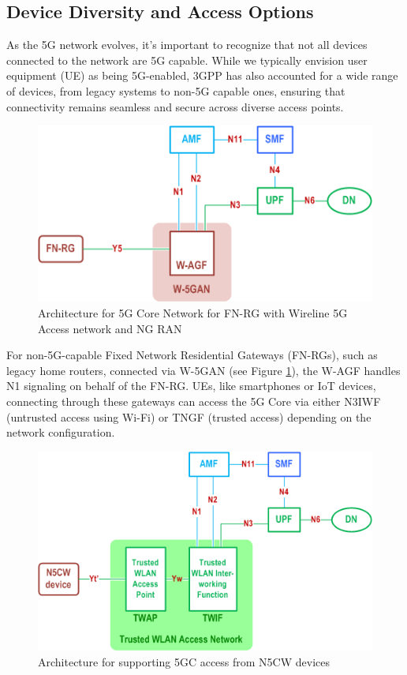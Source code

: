\subsection{Device Diversity and Access Options}

As the 5G network evolves, it's important to recognize that not all devices connected to the network are 5G capable. While we typically envision user equipment (UE) as being 5G-enabled, 3GPP has also accounted for a wide range of devices, from legacy systems to non-5G capable ones, ensuring that connectivity remains seamless and secure across diverse access points.

\begin{figure}
    \centering
    \includegraphics[width=0.5\linewidth]{figs/Architecture for 5G Core Network for FN-RG with Wireline 5G Access network and NG RAN.png}
    \caption{Architecture for 5G Core Network for FN-RG with Wireline 5G Access network and NG RAN}
    \label{fig:Architecture for 5G Core Network for FN-RG with Wireline 5G Access network and NG RAN}
\end{figure}

For non-5G-capable Fixed Network Residential Gateways (FN-RGs), such as legacy home routers, connected via W-5GAN (see Figure \ref{fig:Architecture for 5G Core Network for FN-RG with Wireline 5G Access network and NG RAN}), the W-AGF handles N1 signaling on behalf of the FN-RG. UEs, like smartphones or IoT devices, connecting through these gateways can access the 5G Core via either N3IWF (untrusted access using Wi-Fi) or TNGF (trusted access) depending on the network configuration.

\begin{figure}
    \centering
    \includegraphics[width=0.5\linewidth]{figs/Architecture for supporting 5GC access from N5CW devices.png}
    \caption{Architecture for supporting 5GC access from N5CW devices}
    \label{fig:Architecture for supporting 5GC access from N5CW devices}
\end{figure}

